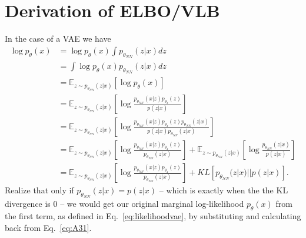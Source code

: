 \section{Derivation of ELBO/VLB}
In the case of a VAE we have
\begin{align}
    \log p_{\theta}(x) & = \log p_{\theta}(x) \int p_{\theta_{NN}}(z|x)dz                                                                                                                                                                           \\
                       & = \int \log p_{\theta}(x) p_{\theta_{NN}}(z|x)dz                                                                                                                                                                           \\
                       & = \mathbb{E}_{z\sim p_{\theta_{NN}}(z|x)}\left[\log p_{\theta}(x) \right]                                                                                                                                                  \\
                       & = \mathbb{E}_{z\sim p_{\theta_{NN}}(z|x)}\left[\log \frac{p_{\theta_{NN}}(x|z)p_{\theta_z}(z)}{p(z|x)}\right]   \label{eq:A31}                                                                                             \\
                       & = \mathbb{E}_{z\sim p_{\theta_{NN}}(z|x)}\left[\log \frac{p_{\theta_{NN}}(x|z)p_{\theta_z}(z)p_{\theta_{NN}}(z|x)}{p(z|x)p_{\theta_{NN}}(z|x)}\right]                                                                      \\
                       & = \mathbb{E}_{z\sim p_{\theta_{NN}}(z|x)}\left[\log \frac{p_{\theta_{NN}}(x|z)p_{\theta_z}(z)}{p_{\theta_{NN}}(z|x)}\right] + \mathbb{E}_{z\sim p_{\theta_{NN}}(z|x)}\left[\log \frac{p_{\theta_{NN}}(z|x)}{p(z|x)}\right] \\
                       & = \mathbb{E}_{z\sim p_{\theta_{NN}}(z|x)}\left[\log \frac{p_{\theta_{NN}}(x|z)p_{\theta_z}(z)}{p_{\theta_{NN}}(z|x)}\right] + KL \left[p_{\theta_{NN}}(z|x)||p(z|x)\right].
\end{align}
Realize that only if $p_{\theta_{NN}}(z|x) = p(z|x)$ -- which is exactly when the the KL divergence is 0 -- we would get our original marginal log-likelihood $p_{\theta}(x)$ from the first term, as defined in Eq.~\ref{eq:likelihoodvae}, by substituting and calculating back from Eq.~\ref{eq:A31}.

